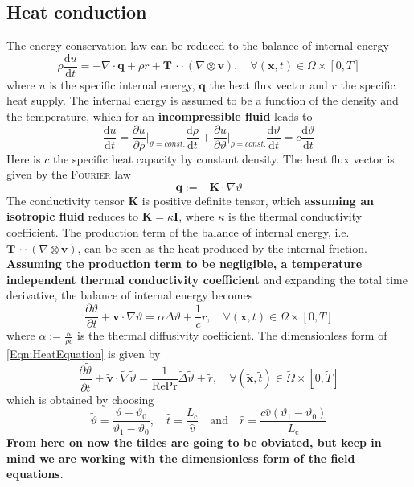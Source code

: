 \documentclass[]{scrartcl}
\newcommand{\pfrac}[2]{\frac{\partial #1}{\partial #2}}
\newcommand{\tdfrac}[2]{\frac{\mathrm{d} #1}{\mathrm{d} #2}}
\newcommand{\bs}[1]{\boldsymbol{#1}}
\newcommand{\cdott}{\, {\cdot}{\cdot}\,}
\begin{document}
\subsection{Heat conduction}
The energy conservation law can be reduced to the balance of internal energy
\begin{equation}\label{Eqn:InternalEnergie}
	\rho \tdfrac{u}{t} = - \nabla \cdot \bs{q} + \rho r + \bs{T} \cdott (\nabla \otimes \bs{v}), \quad \forall (\bs{x}, t) \in \Omega \times \left[0, T \right]
\end{equation}
where $u$ is the specific internal energy, $\bs{q}$ the heat flux vector and $r$ the specific heat supply. The internal energy is assumed to be a function of the density and the temperature, which for an \textbf{incompressible fluid} leads to
\begin{equation*}
	\tdfrac{u}{t} = \pfrac{u}{\rho}\bigg|_{\vartheta = \textit{const.}}\tdfrac{\rho}{t} + \pfrac{u}{\vartheta}\bigg|_{\rho = \textit{const.}} \tdfrac{\vartheta}{t} = c \tdfrac{\vartheta}{t}
\end{equation*}
Here is $c$ the specific heat capacity by constant density. The heat flux vector is given by the \textsc{Fourier} law
\begin{equation*}
	\bs{q} := - \bs{K} \cdot \nabla \vartheta
\end{equation*}
The conductivity tensor $\bs{K}$ is positive definite tensor, which \textbf{assuming an isotropic fluid} reduces to $\bs{K} = \kappa \bs{I}$, where $\kappa$ is the thermal conductivity coefficient.
The production term of the balance of internal energy, i.e. $\bs{T} \cdott (\nabla \otimes \bs{v})$, can be seen as the heat produced by the internal friction.  \textbf{Assuming the production term to be negligible, a temperature independent thermal conductivity coefficient} and expanding the total time derivative, the balance of internal energy becomes
\begin{equation}\label{Eqn:HeatEquation}
	\pfrac{\vartheta}{t} + \bs{v} \cdot \nabla \vartheta = \alpha \Delta \vartheta + \frac{1}{c} r , \quad \forall (\bs{x}, t) \in \Omega \times \left[0, T \right]
\end{equation}
where $\alpha := \tfrac{\kappa}{\rho c}$ is the thermal diffusivity coefficient. The dimensionless form of \cref{Eqn:HeatEquation} is given by 
\begin{equation}\label{Eqn:DimensionlessHeatEquation}
	\pfrac{\tilde{\vartheta}}{\tilde{t}} + \bs{\tilde{v}} \cdot \tilde{\nabla} \tilde{\vartheta} = \dfrac{1}{\mathrm{Re}\mathrm{Pr}} \tilde{\Delta} \tilde{\vartheta} + \tilde{r }, \quad \forall (\bs{\tilde{x}}, \tilde{t}) \in\tilde{ \Omega }\times [0,\tilde{ T} ]
\end{equation}
which is obtained by choosing
\begin{equation*}
	\tilde{\vartheta} = \dfrac{\vartheta-\vartheta_0}{\vartheta_1 - \vartheta_0}, \quad
	 \hat{t} = \dfrac{L_\textrm{c}}{\hat{v}} \quad \textrm{and} \quad \hat{r} = \dfrac{c\hat{v} (\vartheta_1 - \vartheta_0)}{L_\textrm{c}}
\end{equation*}
 \textbf{From here on now the tildes are going to be obviated, but keep in mind we are working with the dimensionless form of the field equations}.\\
\end{document}
